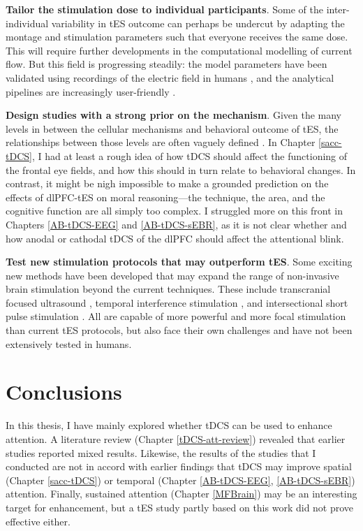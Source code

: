 \documentclass[11pt,english,]{memoir}
\begin{document}
\textbf{Tailor the stimulation dose to individual participants}. Some of the inter-individual variability in tES outcome can perhaps be undercut by adapting the montage and stimulation parameters such that everyone receives the same dose. This will require further developments in the computational modelling of current flow. But this field is progressing steadily: the model parameters have been validated using recordings of the electric field in humans \autocites{Huang2017}{Opitz2016}, and the analytical pipelines are increasingly user-friendly \autocites{Saturnino2018}{Huang2018}.

\textbf{Design studies with a strong prior on the mechanism}. Given the many levels in between the cellular mechanisms and behavioral outcome of tES, the relationships between those levels are often vaguely defined \autocite{Bestmann2014}. In Chapter \ref{sacc-tDCS}, I had at least a rough idea of how tDCS should affect the functioning of the frontal eye fields, and how this should in turn relate to behavioral changes. In contrast, it might be nigh impossible to make a grounded prediction on the effects of dlPFC-tES on moral reasoning---the technique, the area, and the cognitive function are all simply too complex. I struggled more on this front in Chapters \ref{AB-tDCS-EEG} and \ref{AB-tDCS-sEBR}, as it is not clear whether and how anodal or cathodal tDCS of the dlPFC should affect the attentional blink.

\textbf{Test new stimulation protocols that may outperform tES}. Some exciting new methods have been developed that may expand the range of non-invasive brain stimulation beyond the current techniques. These include transcranial focused ultrasound \autocites{Folloni2019}{Verhagen2019}, temporal interference stimulation \autocite{Grossman2017}, and intersectional short pulse stimulation \autocite{Voroslakos2018}. All are capable of more powerful and more focal stimulation than current tES protocols, but also face their own challenges and have not been extensively tested in humans.

\hypertarget{conclusions-1}{%
\section{Conclusions}\label{conclusions-1}}

In this thesis, I have mainly explored whether tDCS can be used to enhance attention. A literature review (Chapter \ref{tDCS-att-review}) revealed that earlier studies reported mixed results. Likewise, the results of the studies that I conducted are not in accord with earlier findings that tDCS may improve spatial (Chapter \ref{sacc-tDCS}) or temporal (Chapter \ref{AB-tDCS-EEG}, \ref{AB-tDCS-sEBR}) attention. Finally, sustained attention (Chapter \ref{MFBrain}) may be an interesting target for enhancement, but a tES study partly based on this work \autocite{VanSchouwenburg2019} did not prove effective either.
\end{document}
